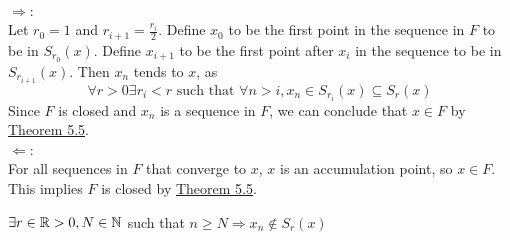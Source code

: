 
\begin{solution}
 \\$\Rightarrow$: \\
 Let $r_0 = 1$ and $r_{i+1} = \frac{r_i}{2}$. Define $x_0$ to be the first point in the sequence in $F$ to be in $S_{r_0}(x)$. Define $x_{i+1}$ to be the first point after $x_i$ in the sequence to be in $S_{r_{i+1}}(x)$. Then $x_n$ tends to $x$, as 
 $$\forall r > 0 \exists r_i < r \text{ such that } \forall n > i, x_n \in S_{r_i}(x) \subseteq S_r(x)$$
 Since $F$ is closed and $x_n$ is a sequence in $F$, we can conclude that $x \in F$ by \hyperref[thm3.5.5]{Theorem 5.5}. \\
 
 $\Leftarrow$: \\
 For all sequences in $F$ that converge to $x$, $x$ is an accumulation point, so $x \in F$. This implies $F$ is closed by \hyperref[thm3.5.5]{Theorem 5.5}.
\end{solution}


\begin{solution}
 $\exists r \in \mathbb{R} > 0, N \in \mathbb{N}$ such that $n \geq N \Rightarrow x_n \notin S_r(x)$
\end{solution}
